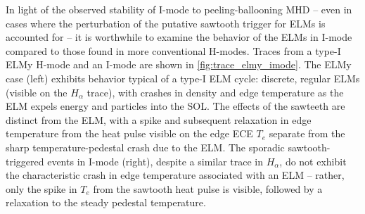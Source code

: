 \begin{figure}[h]
 \pushtooutside
\end{figure}

In light of the observed stability of I-mode to peeling-ballooning MHD -- even in cases where the perturbation of the putative sawtooth trigger for ELMs is accounted for -- it is worthwhile to examine the behavior of the ELMs in I-mode compared to those found in more conventional H-modes.  Traces from a type-I ELMy H-mode and an I-mode are shown in \cref{fig:trace_elmy_imode}.  The ELMy case (left) exhibits behavior typical of a type-I ELM cycle: discrete, regular ELMs (visible on the $H_\alpha$ trace), with crashes in density and edge temperature as the ELM expels energy and particles into the SOL.  The effects of the sawteeth are distinct from the ELM, with a spike and subsequent relaxation in edge temperature from the heat pulse visible on the edge ECE $T_e$ separate from the sharp temperature-pedestal crash due to the ELM.  The sporadic sawtooth-triggered events in I-mode (right), despite a similar trace in $H_\alpha$, do not exhibit the characteristic crash in edge temperature associated with an ELM -- rather, only the spike in $T_e$ from the sawtooth heat pulse is visible, followed by a relaxation to the steady pedestal temperature.

